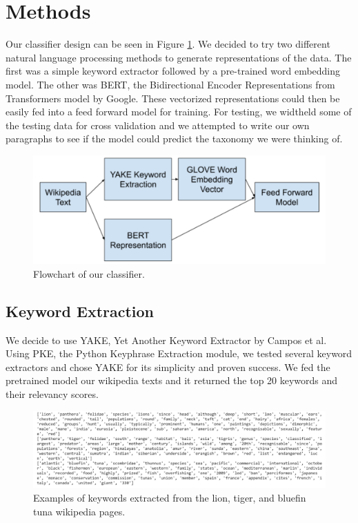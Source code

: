 \documentclass[10pt,twocolumn,letterpaper]{article}
\begin{document}
\section{Methods}

Our classifier design can be seen in Figure \ref{fig:classifier_overview}. We decided to try two different natural language processing methods to generate representations of the data. The first was a simple keyword extractor followed by a pre-trained word embedding model. The other was BERT, the Bidirectional Encoder Representations from Transformers model by Google. These vectorized representations could then be easily fed into a feed forward model for training. For testing, we widtheld some of the testing data for cross validation and we attempted to write our own paragraphs to see if the model could predict the taxonomy we were thinking of. 
\begin{figure}
  \includegraphics[width=\linewidth]{classifier_overview.png}
  \caption{Flowchart of our classifier.}
  \label{fig:classifier_overview}
\end{figure}

\subsection{Keyword Extraction}
We decide to use YAKE, Yet Another Keyword Extractor by Campos et al. Using PKE, the Python Keyphrase Extraction module, we tested several keyword extractors and chose YAKE for its simplicity and proven success. We fed the pretrained model our wikipedia texts and it returned the top 20 keywords and their relevancy scores. 
\begin{figure}
  \includegraphics[width=\linewidth]{keywords_example.png}
  \caption{Examples of keywords extracted from the lion, tiger, and bluefin tuna wikipedia pages.}
  \label{fig:keywords_example}
\end{figure}
\end{document}
